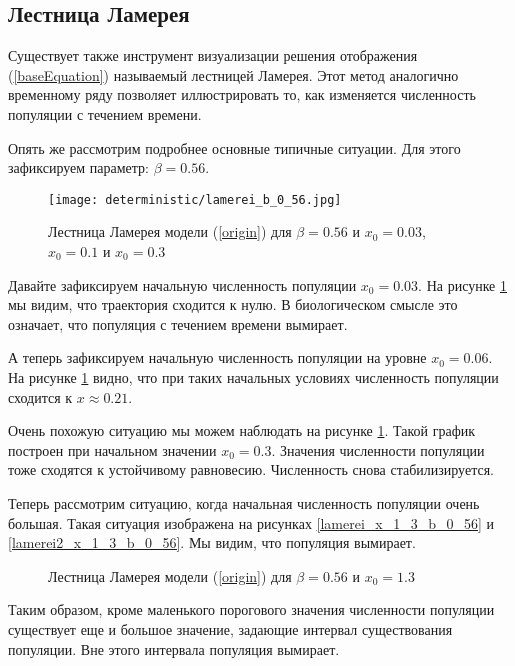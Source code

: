 \subsection{Лестница Ламерея}

    Существует также инструмент визуализации решения отображения (\ref{baseEquation}) называемый лестницей Ламерея. Этот метод аналогично временному ряду позволяет иллюстрировать то, как изменяется численность популяции с течением времени.
    
    Опять же рассмотрим подробнее основные типичные ситуации. Для этого зафиксируем параметр: \(\beta = 0.56\). 

    \begin{figure}
        \centering
        \texttt{[image: deterministic/lamerei\_b\_0\_56.jpg]}

        \captionsetup{justification=centering}
        \caption{Лестница Ламерея модели (\ref{origin}) для \(\beta = 0.56\) и \(x_0 = 0.03\), \(x_0 = 0.1\) и \(x_0 = 0.3\)}
        \label{lamerei_b_0_56}
    \end{figure}

    Давайте зафиксируем начальную численность популяции \(x_0 = 0.03\). На рисунке \ref{lamerei_b_0_56} мы видим, что траектория сходится к нулю. В биологическом смысле это означает, что популяция с течением времени вымирает.

    А теперь зафиксируем начальную численность популяции на уровне \(x_0 = 0.06\). На рисунке \ref{lamerei_b_0_56} видно, что при таких начальных условиях численность популяции сходится к \(x \approx 0.21\).
    
    Очень похожую ситуацию мы можем наблюдать на рисунке \ref{lamerei_b_0_56}. Такой график построен при начальном значении \(x_0 = 0.3\). Значения численности популяции тоже сходятся к устойчивому равновесию. Численность снова стабилизируется.
    
    Теперь рассмотрим ситуацию, когда начальная численность популяции очень большая. Такая ситуация изображена на рисунках \ref{lamerei_x_1_3_b_0_56} и \ref{lamerei2_x_1_3_b_0_56}. Мы видим, что популяция вымирает.

    \begin{figure}
        \centering


        \captionsetup{justification=centering}
        \caption{Лестница Ламерея модели (\ref{origin}) для \(\beta = 0.56\) и \(x_0 = 1.3\)}
    \end{figure}

    Таким образом, кроме маленького порогового значения численности популяции существует еще и большое значение, задающие интервал существования популяции. Вне этого интервала популяция вымирает. 
